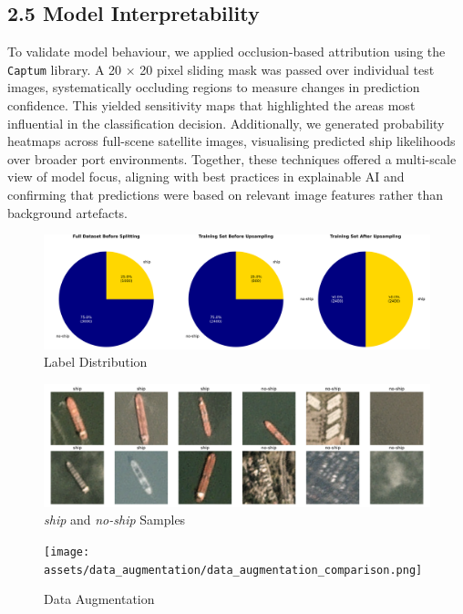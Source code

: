 \documentclass[11pt]{article}
\begin{document}
	\subsection*{2.5 Model Interpretability}
	
	To validate model behaviour, we applied occlusion-based attribution using the \texttt{Captum} library. A 20 × 20 pixel sliding mask was passed over individual test images, systematically occluding regions to measure changes in prediction confidence. This yielded sensitivity maps that highlighted the areas most influential in the classification decision. Additionally, we generated probability heatmaps across full-scene satellite images, visualising predicted ship likelihoods over broader port environments. Together, these techniques offered a multi-scale view of model focus, aligning with best practices in explainable AI and confirming that predictions were based on relevant image features rather than background artefacts.
	
	\begin{figure}[H]
		\centering
		\caption{Label Distribution}
		\includegraphics[width=\linewidth]{assets/label_distribution/label_distribution.png}
	\end{figure}
	
	\begin{figure}[H]
		\centering
		\caption{\textit{ship} and \textit{no-ship} Samples}
		\includegraphics[width=\linewidth]{assets/data_example/ship_vs_noship_examples.png}
	\end{figure}
	
	\begin{figure}[H]
		\centering
		\caption{Data Augmentation}
		\texttt{[image: assets/data\_augmentation/data\_augmentation\_comparison.png]}
	\end{figure}
	
\end{document}
